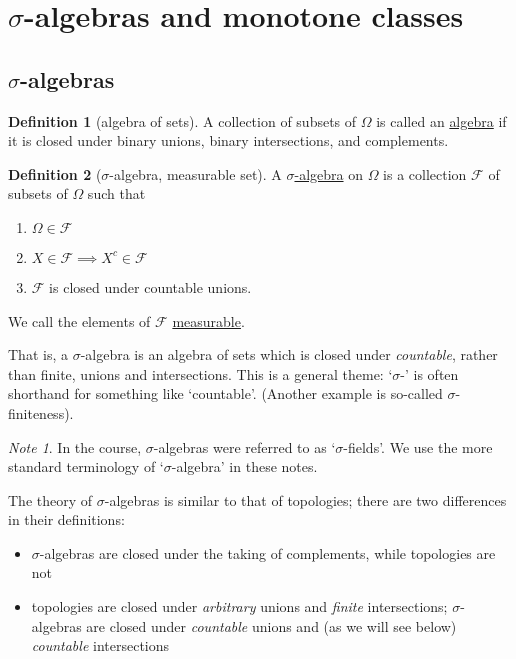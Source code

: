 \documentclass[a4paper,12pt]{scrreprt}
\newcommand{\defn}[1]{\ul{#1}}
\theoremstyle{definition}
\newtheorem{definition}{Definition}[section]
\theoremstyle{plain}
\theoremstyle{remark}
\newtheorem{note}{Note}[section]
\begin{document}
\section{\texorpdfstring{$\sigma$}{s}-algebras and monotone classes}
\subsection{\texorpdfstring{$\sigma$}{Lg}-algebras}
\begin{definition}[algebra of sets]
  \label{def:algebraofsets}
  A collection of subsets of $\Omega$ is called an \defn{algebra} if it is closed under binary unions, binary intersections, and complements.
\end{definition}

\begin{definition}[$\sigma$-algebra, measurable set]
  \label{def:sigmaalgebra}
  A \defn{$\sigma$-algebra} on $\Omega$ is a collection $\mathcal{F}$ of subsets of $\Omega$ such that
  \begin{enumerate}
    \item $\Omega \in \mathcal{F}$
    \item $X \in \mathcal{F} \implies X^{c} \in \mathcal{F}$
    \item $\mathcal{F}$ is closed under countable unions.
  \end{enumerate}

  We call the elements of $\mathcal{F}$ \defn{measurable}.
\end{definition}

That is, a $\sigma$-algebra is an algebra of sets which is closed under \emph{countable}, rather than finite, unions and intersections. This is a general theme: `$\sigma$-' is often shorthand for something like `countable'. (Another example is so-called $\sigma$-finiteness).

\begin{note}
  In the course, $\sigma$-algebras were referred to as `$\sigma$-fields'. We use the more standard terminology of `$\sigma$-algebra' in these notes.
\end{note}

The theory of $\sigma$-algebras is similar to that of topologies; there are two differences in their definitions:
\begin{itemize}
  \item $\sigma$-algebras are closed under the taking of complements, while topologies are not

  \item topologies are closed under \emph{arbitrary} unions and \emph{finite} intersections; $\sigma$-algebras are closed under \emph{countable} unions and (as we will see below) \emph{countable} intersections
\end{itemize}
\end{document}
